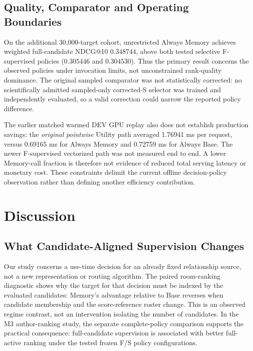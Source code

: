 \documentclass[preprint,12pt]{elsarticle}
\begin{document}
\subsection{Quality, Comparator and Operating Boundaries}
\label{sec:results-boundaries}

On the additional 30,000-target cohort, unrestricted Always Memory achieves weighted full-candidate NDCG@10 $0.348744$, above both tested selective F-supervised policies ($0.305446$ and $0.304530$). Thus the primary result concerns the observed policies under invocation limits, not unconstrained rank-quality dominance. The original sampled comparator was not statistically corrected: no scientifically admitted sampled-only corrected-S selector was trained and independently evaluated, so a valid correction could narrow the reported policy difference.

The earlier matched warmed DEV GPU replay also does not establish production savings: the \emph{original pointwise} Utility path averaged 1.76941 ms per request, versus 0.69165 ms for Always Memory and 0.72759 ms for Always Base. The newer F-supervised vectorized path was not measured end to end. A lower Memory-call fraction is therefore not evidence of reduced total serving latency or monetary cost. These constraints delimit the current offline decision-policy observation rather than defining another efficiency contribution.

\FloatBarrier

\section{Discussion}
\label{sec:discussion}

\subsection{What Candidate-Aligned Supervision Changes}
\label{sec:discussion-values}

Our study concerns a use-time decision for an already fixed relationship source, not a new representation or routing algorithm. The paired room-ranking diagnostic shows why the target for that decision must be indexed by the evaluated candidates: Memory's advantage relative to Base reverses when candidate membership and the score-reference roster change. This is an observed regime contrast, not an intervention isolating the number of candidates. In the M3 author-ranking study, the separate complete-policy comparison supports the practical consequence: full-candidate supervision is associated with better full-active ranking under the tested frozen F/S policy configurations.
\end{document}
